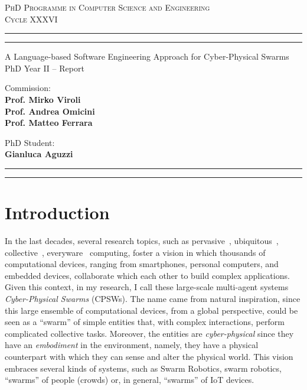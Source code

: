 \documentclass[11pt]{article}
\begin{document}
\sloppy
\begin{center}
	{{
		\Large{
			\textsc{PhD Programme in Computer Science and Engineering \\ 
			\vspace{4mm}
			Cycle XXXVI}
			}
	}} 
	\rule[0.1cm]{\textwidth}{0.1mm}
	\rule[0.4cm]{\textwidth}{0.6mm}
\end{center}

\begin{center}
	{\LARGE{A Language-based Software Engineering Approach for Cyber-Physical Swarms}} \\
	\vspace{4mm}
	{\large{PhD Year II -- Report}} 
	\vspace{4mm}
\end{center}
\vspace{8mm}
\par
\noindent
\begin{minipage}[t]{0.47\textwidth}

{\large{Commission: \\\bf
Prof. Mirko Viroli \\
Prof. Andrea Omicini \\
Prof. Matteo Ferrara} 
}
\end{minipage}
\hfill
\begin{minipage}[t]{0.47\textwidth}
	\raggedleft
	{
		\large{PhD Student: \\\bf Gianluca Aguzzi}
	}
\end{minipage}
\vspace{10mm}

{
	\raggedright
	\rule[0.1cm]{\textwidth}{0.6mm}
	\rule[0.5cm]{\textwidth}{0.1mm}
}

\newcommand{\rev}[1]{{
	#1
	}}
\section{Introduction}
In the last decades, several research topics, such as pervasive~\cite{pervasive}, 
 ubiquitous~\cite{weiser1999computer}, collective~\cite{abowd2016beyond}, everyware~\cite{greenfield2010everyware} computing, 
 foster a vision in which thousands of computational devices, 
 ranging from smartphones, personal computers, and embedded devices,
 collaborate which each other to build complex applications.
%
Given this context, in my research, I call these large-scale multi-agent systems \textit{Cyber-Physical Swarms} (CPSWs).
%
The name came from natural inspiration, since this large ensemble of computational devices, 
 from a global perspective, could be seen as a ``swarm'' of simple entities that, with complex interactions, 
 perform complicated collective tasks.
%
Moreover, the entities are \textit{cyber-physical} since they have an \textit{embodiment} in the environment, 
 namely, they have a physical counterpart with which they can sense and alter the physical world.
%
This vision embraces several kinds of systems, such as Swarm Robotics,
 swarm robotics, ``swarms'' of people (crowds) or, in general, ``swarms'' of IoT devices.
\end{document}

